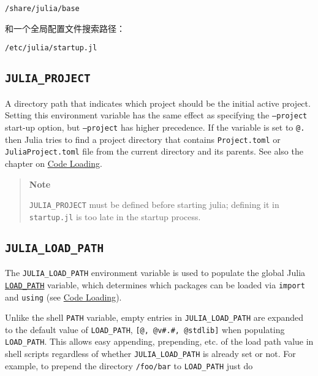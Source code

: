 \begin{lstlisting}
/share/julia/base
\end{lstlisting}



和一个全局配置文件搜索路径：




\begin{lstlisting}
/etc/julia/startup.jl
\end{lstlisting}



\hypertarget{4954349069727209817}{}


\subsection{\texttt{JULIA\_PROJECT}}



A directory path that indicates which project should be the initial active project. Setting this environment variable has the same effect as specifying the \texttt{--project} start-up option, but \texttt{--project} has higher precedence. If the variable is set to \texttt{@.} then Julia tries to find a project directory that contains \texttt{Project.toml} or \texttt{JuliaProject.toml} file from the current directory and its parents. See also the chapter on \href{@ref}{Code Loading}.



\begin{quote}
\textbf{Note}

\texttt{JULIA\_PROJECT} must be defined before starting julia; defining it in \texttt{startup.jl} is too late in the startup process.

\end{quote}


\hypertarget{1363234541366705734}{}


\subsection{\texttt{JULIA\_LOAD\_PATH}}



The \texttt{JULIA\_LOAD\_PATH} environment variable is used to populate the global Julia \hyperlink{17914149694871263675}{\texttt{LOAD\_PATH}} variable, which determines which packages can be loaded via \texttt{import} and \texttt{using} (see \href{@ref}{Code Loading}).



Unlike the shell \texttt{PATH} variable, empty entries in \texttt{JULIA\_LOAD\_PATH} are expanded to the default value of \texttt{LOAD\_PATH}, \texttt{[{\textquotedbl}@{\textquotedbl}, {\textquotedbl}@v\#.\#{\textquotedbl}, {\textquotedbl}@stdlib{\textquotedbl}]} when populating \texttt{LOAD\_PATH}. This allows easy appending, prepending, etc. of the load path value in shell scripts regardless of whether \texttt{JULIA\_LOAD\_PATH} is already set or not. For example, to prepend the directory \texttt{/foo/bar} to \texttt{LOAD\_PATH} just do




